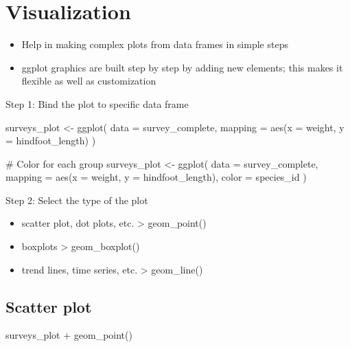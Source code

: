 \documentclass[
  letterpaper,
  DIV=11,
  numbers=noendperiod]{scrreprt}
\newenvironment{Shaded}{\begin{snugshade}}{\end{snugshade}}
\newcommand{\AttributeTok}[1]{\textcolor[rgb]{0.40,0.45,0.13}{#1}}
\newcommand{\CommentTok}[1]{\textcolor[rgb]{0.37,0.37,0.37}{#1}}
\newcommand{\FunctionTok}[1]{\textcolor[rgb]{0.28,0.35,0.67}{#1}}
\newcommand{\NormalTok}[1]{\textcolor[rgb]{0.00,0.23,0.31}{#1}}
\newcommand{\OtherTok}[1]{\textcolor[rgb]{0.00,0.23,0.31}{#1}}
\newcommand{\SpecialCharTok}[1]{\textcolor[rgb]{0.37,0.37,0.37}{#1}}
\providecommand{\tightlist}{%
  \setlength{\itemsep}{0pt}\setlength{\parskip}{0pt}}\usepackage{longtable,booktabs,array}
\begin{document}
\section{Visualization}\label{visualization}

\begin{itemize}
\tightlist
\item
  Help in making complex plots from data frames in simple steps
\item
  ggplot graphics are built step by step by adding new elements; this
  makes it flexible as well as customization
\end{itemize}

Step 1: Bind the plot to specific data frame

\begin{Shaded}
\begin{Highlighting}[]
\NormalTok{surveys\_plot }\OtherTok{\textless{}{-}} \FunctionTok{ggplot}\NormalTok{(}
  \AttributeTok{data =}\NormalTok{ survey\_complete,}
  \AttributeTok{mapping =} \FunctionTok{aes}\NormalTok{(}\AttributeTok{x =}\NormalTok{ weight, }\AttributeTok{y =}\NormalTok{ hindfoot\_length)}
\NormalTok{)}

\CommentTok{\# Color for each group}
\NormalTok{surveys\_plot }\OtherTok{\textless{}{-}} \FunctionTok{ggplot}\NormalTok{(}
  \AttributeTok{data =}\NormalTok{ survey\_complete,}
  \AttributeTok{mapping =} \FunctionTok{aes}\NormalTok{(}\AttributeTok{x =}\NormalTok{ weight, }\AttributeTok{y =}\NormalTok{ hindfoot\_length),}
  \AttributeTok{color =}\NormalTok{ species\_id}
\NormalTok{)}
\end{Highlighting}
\end{Shaded}

Step 2: Select the type of the plot

\begin{itemize}
\tightlist
\item
  scatter plot, dot plots, etc. \textgreater{} geom\_point()
\item
  boxplots \textgreater{} geom\_boxplot()
\item
  trend lines, time series, etc. \textgreater{} geom\_line()
\end{itemize}

\subsection{Scatter plot}\label{scatter-plot}

\begin{Shaded}
\begin{Highlighting}[]
\NormalTok{surveys\_plot }\SpecialCharTok{+} \FunctionTok{geom\_point}\NormalTok{()}
\end{Highlighting}
\end{Shaded}
\end{document}
